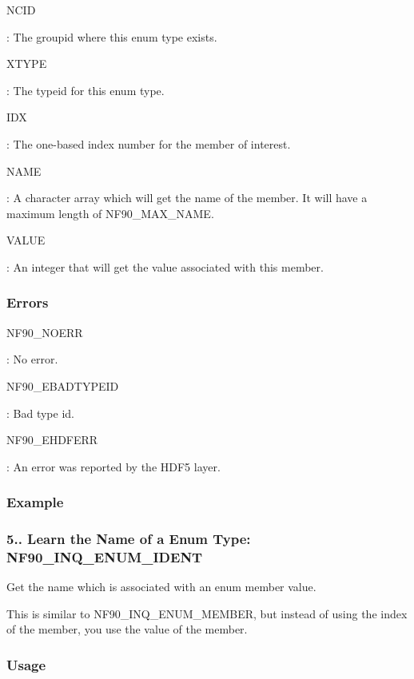 {\ttfamily N\+C\+ID}

\+: The groupid where this enum type exists.

{\ttfamily X\+T\+Y\+PE}

\+: The typeid for this enum type.

{\ttfamily I\+DX}

\+: The one-\/based index number for the member of interest.

{\ttfamily N\+A\+ME}

\+: A character array which will get the name of the member. It will have a maximum length of N\+F90\+\_\+\+M\+A\+X\+\_\+\+N\+A\+ME.

{\ttfamily V\+A\+L\+UE}

\+: An integer that will get the value associated with this member.

\subsubsection*{Errors}

{\ttfamily N\+F90\+\_\+\+N\+O\+E\+RR}

\+: No error.

{\ttfamily N\+F90\+\_\+\+E\+B\+A\+D\+T\+Y\+P\+E\+ID}

\+: Bad type id.

{\ttfamily N\+F90\+\_\+\+E\+H\+D\+F\+E\+RR}

\+: An error was reported by the H\+D\+F5 layer.

\subsubsection*{Example}\hypertarget{f90-user-defined-data-types_f90-learn-the-name-of-a-enum-type-nf90_inq_enum_ident}{}\subsubsection{5.. Learn the Name of a Enum Type\+: N\+F90\+\_\+\+I\+N\+Q\+\_\+\+E\+N\+U\+M\+\_\+\+I\+D\+E\+NT}\label{f90-user-defined-data-types_f90-learn-the-name-of-a-enum-type-nf90_inq_enum_ident}
Get the name which is associated with an enum member value.

This is similar to N\+F90\+\_\+\+I\+N\+Q\+\_\+\+E\+N\+U\+M\+\_\+\+M\+E\+M\+B\+ER, but instead of using the index of the member, you use the value of the member.

\subsubsection*{Usage}


